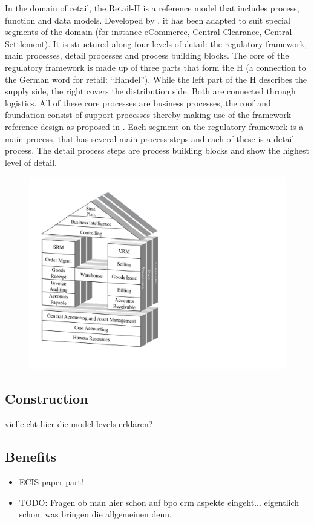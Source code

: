 		In the domain of retail, the Retail-H is a reference model that includes process, function and data models. Developed by \cite{Becker2004a}, it has been adapted to suit special segments of the domain (for instance eCommerce, Central Clearance, Central Settlement). 
		It is structured along four levels of detail: the regulatory framework, main processes, detail processes and process building blocks. The core of the regulatory framework is made up of three parts that form the H (a connection to the German word for retail: “Handel”). While the left part of the H describes the supply side, the right covers the distribution side. Both are connected through logistics. All of these core processes are business processes, the roof and foundation consist of support processes thereby making use of the framework reference design as proposed in \cite{Meise2001}. 
		Each segment on the regulatory framework is a main process, that has several main process steps and each of these is a detail process. The detail process steps are process building blocks and show the highest level of detail. 
		\begin{figure}[caption={Retail-H}, label={fig:retailh}]
			{	\includegraphics[width=.6\textwidth]{figures/retailh.pdf}}
		\end{figure}
		
	
	
	
		\subsection{Construction}
		vielleicht hier die model levels erklären?
		\subsection{Benefits}
		\begin{itemize}
			\item  ECIS paper part!
			\item TODO: Fragen ob man hier schon auf bpo crm aspekte eingeht... eigentlich schon. was bringen die allgemeinen denn. 
		\end{itemize}
